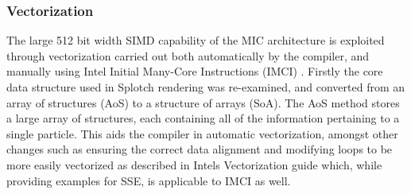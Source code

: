 \documentclass[runningheads,a4paper]{llncs}
\begin{document}



\subsubsection{Vectorization}
\label{sect:vectorization}

The large 512 bit width SIMD capability of the MIC architecture is exploited through vectorization carried out both 
automatically by the compiler, and manually using Intel Initial Many-Core Instructions (IMCI) \cite{imci}. Firstly the 
core data structure used in Splotch rendering was re-examined, and converted from an array of structures (AoS) to 
a structure of arrays (SoA). The AoS method stores a large array of structures, each containing all of the 
information pertaining to a single particle. This aids the compiler in automatic vectorization, 
amongst other changes such as ensuring the correct data alignment and modifying loops to be more easily vectorized 
as described in Intels Vectorization guide \cite{vectorguide} which, while providing examples for SSE, is applicable 
to IMCI as well. 
\end{document}
